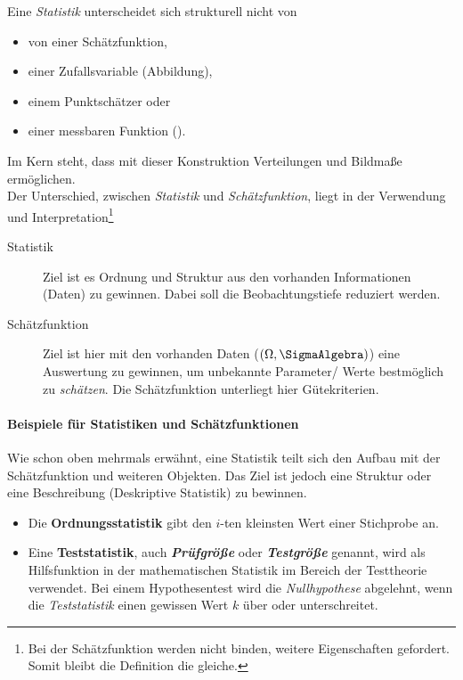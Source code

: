 Eine \textit{Statistik} unterscheidet sich strukturell nicht von
\begin{itemize}
	\item von einer Schätzfunktion,
	\item einer Zufallsvariable (Abbildung),
	\item einem Punktschätzer oder
	\item einer messbaren Funktion ().
\end{itemize}

Im Kern steht, dass mit dieser Konstruktion Verteilungen und Bildmaße ermöglichen.\\

Der Unterschied, zwischen \textit{Statistik} und \textit{Schätzfunktion}, liegt in der Verwendung und Interpretation\footnote{Bei der Schätzfunktion werden nicht binden, weitere Eigenschaften gefordert. Somit bleibt die Definition die gleiche.}

\begin{description}
	\item[Statistik] Ziel ist es Ordnung und Struktur aus den vorhanden Informationen (Daten) zu gewinnen. Dabei soll die Beobachtungstiefe reduziert werden. 
	\item[Schätzfunktion] Ziel ist hier mit den vorhanden Daten ($\left(\Omega, \SigmaAlgebra \right)$) eine Auswertung zu gewinnen, um unbekannte Parameter/ Werte bestmöglich zu \textit{schätzen}. Die Schätzfunktion unterliegt hier Gütekriterien.
\end{description}

\paragraph{Beispiele für Statistiken und Schätzfunktionen}
Wie schon oben mehrmals erwähnt, eine Statistik teilt sich den Aufbau mit der Schätzfunktion und weiteren Objekten. Das Ziel ist jedoch eine Struktur oder eine Beschreibung (Deskriptive Statistik) zu bewinnen.\\

\begin{itemize}
	\item Die \textbf{Ordnungsstatistik} gibt den $i$-ten kleinsten Wert einer Stichprobe an.\\
	\item Eine \textbf{Teststatistik}, auch \textit{\textbf{Prüfgröße}} oder \textit{\textbf{Testgröße}} genannt, wird als Hilfsfunktion in der mathematischen Statistik im Bereich der Testtheorie verwendet. Bei einem Hypothesentest wird die \textit{Nullhypothese} abgelehnt, wenn die \textit{Teststatistik} einen gewissen Wert $k$ über oder unterschreitet.
\end{itemize}


